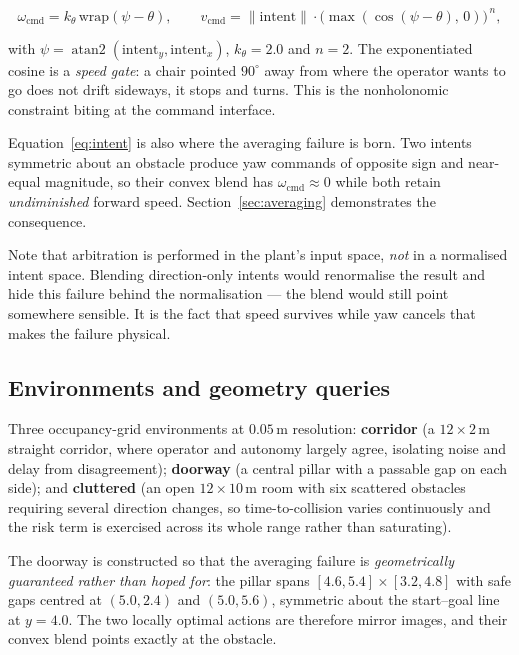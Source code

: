 \documentclass[11pt,a4paper]{article}
\theoremstyle{plain}
\theoremstyle{definition}
\begin{document}
\begin{equation}
\omega_{\mathrm{cmd}} = k_\theta\,\mathrm{wrap}(\psi - \theta),
\qquad
v_{\mathrm{cmd}} = \lVert \text{intent}\rVert \cdot
\bigl(\max(\cos(\psi - \theta),\,0)\bigr)^{\,n},
\label{eq:intent}
\end{equation}

with $\psi = \operatorname{atan2}(\text{intent}_y, \text{intent}_x)$,
$k_\theta = 2.0$ and $n = 2$. The exponentiated cosine is a
\emph{speed gate}: a chair pointed $90^\circ$ away from where the
operator wants to go does not drift sideways, it stops and turns. This
is the nonholonomic constraint biting at the command interface.

Equation~\eqref{eq:intent} is also where the averaging failure is born.
Two intents symmetric about an obstacle produce yaw commands of opposite
sign and near-equal magnitude, so their convex blend has
$\omega_{\mathrm{cmd}} \approx 0$ while both retain \emph{undiminished}
forward speed. Section~\ref{sec:averaging} demonstrates the consequence.

Note that arbitration is performed in the plant's input space,
\emph{not} in a normalised intent space. Blending direction-only intents
would renormalise the result and hide this failure behind the
normalisation --- the blend would still point somewhere sensible. It is
the fact that speed survives while yaw cancels that makes the failure
physical.

\subsection{Environments and geometry queries}

Three occupancy-grid environments at $0.05$\,m resolution:
\textbf{corridor} (a $12 \times 2$\,m straight corridor, where operator
and autonomy largely agree, isolating noise and delay from
disagreement); \textbf{doorway} (a central pillar with a passable gap on
each side); and \textbf{cluttered} (an open $12\times10$\,m room with six
scattered obstacles requiring several direction changes, so
time-to-collision varies continuously and the risk term is exercised
across its whole range rather than saturating).

The doorway is constructed so that the averaging failure is
\emph{geometrically guaranteed rather than hoped for}: the pillar spans
$[4.6, 5.4]\times[3.2, 4.8]$ with safe gaps centred at $(5.0, 2.4)$ and
$(5.0, 5.6)$, symmetric about the start--goal line at $y = 4.0$. The two
locally optimal actions are therefore mirror images, and their convex
blend points exactly at the obstacle.
\end{document}
